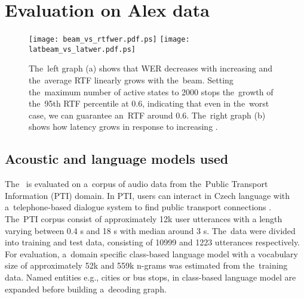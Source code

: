 



\section{Evaluation on Alex data}
\label{sec:eval}

\begin{figure*}[t]
    \begin{center}
    \texttt{[image: beam\_vs\_rtfwer.pdf.ps]}
    \texttt{[image: latbeam\_vs\_latwer.pdf.ps]}
    \caption{The~left graph (a) shows that WER decreases with increasing  and the~average RTF linearly grows with the~beam.
    Setting the~maximum number of active states to 2000 stops the~growth of the~95th RTF percentile at 0.6, indicating that even in the~worst case, we can guarantee an~RTF around 0.6.
    The~right graph (b) shows how latency grows in response to increasing .}
    \label{fig:wer} 
    \end{center}
\end{figure*}

\subsection{Acoustic and language models used}
\label{sec:train}

The~ is evaluated on a~corpus of audio data from the~Public Transport Information (PTI) domain.
In PTI, users can interact in Czech language with a~telephone-based dialogue system to find public transport connections \cite{ptics2014url}.
The~PTI corpus consist of approximately 12k user utterances with a length varying between 0.4 s and 18 s with median around 3 s.
The~data were divided into training and test data, consisting of 10999 and 1223 utterances respectively.
For evaluation, a~domain specific class-based language model with a vocabulary size of approximately 52k  and 559k n-grams was estimated from the~training data.
Named entities e.g., cities or bus stops, in class-based language model are expanded before building a~decoding graph.

